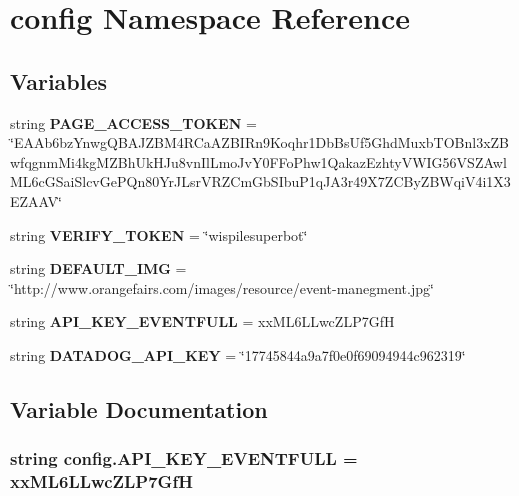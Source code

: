 \section{config Namespace Reference}
\label{namespaceconfig}
\subsection*{Variables}
\begin{DoxyCompactItemize}
\item 
string {\bf P\+A\+G\+E\+\_\+\+A\+C\+C\+E\+S\+S\+\_\+\+T\+O\+K\+EN} = \char`\"{}E\+A\+Ab6bz\+Ynwg\+Q\+B\+A\+J\+Z\+B\+M4\+R\+Ca\+A\+Z\+B\+I\+Rn9\+Koqhr1\+Db\+Bs\+Uf5\+Ghd\+Muxb\+T\+O\+Bnl3x\+Z\+Bwfqgnm\+Mi4kg\+M\+Z\+Bh\+Uk\+H\+Ju8vn\+Il\+Lmo\+Jv\+Y0\+F\+Fo\+Phw1\+Qakaz\+Ezhty\+V\+W\+I\+G56\+V\+S\+Z\+Awl\+M\+L6c\+G\+Sai\+Slcv\+Ge\+P\+Qn80\+Yr\+J\+Lsr\+V\+R\+Z\+Cm\+Gb\+S\+Ibu\+P1q\+J\+A3r49\+X7\+Z\+C\+By\+Z\+B\+Wqi\+V4i1\+X3\+E\+Z\+A\+AV\char`\"{}
\item 
string {\bf V\+E\+R\+I\+F\+Y\+\_\+\+T\+O\+K\+EN} = \char`\"{}wispilesuperbot\char`\"{}
\item 
string {\bf D\+E\+F\+A\+U\+L\+T\+\_\+\+I\+MG} = \char`\"{}http\+://www.\+orangefairs.\+com/images/resource/event-\/manegment.\+jpg\char`\"{}
\item 
string {\bf A\+P\+I\+\_\+\+K\+E\+Y\+\_\+\+E\+V\+E\+N\+T\+F\+U\+LL} = \textquotesingle{}xx\+M\+L6\+L\+Lwc\+Z\+L\+P7\+GfH\textquotesingle{}
\item 
string {\bf D\+A\+T\+A\+D\+O\+G\+\_\+\+A\+P\+I\+\_\+\+K\+EY} = \char`\"{}17745844a9a7f0e0f69094944c962319\char`\"{}
\end{DoxyCompactItemize}


\subsection{Variable Documentation}
\subsubsection[{A\+P\+I\+\_\+\+K\+E\+Y\+\_\+\+E\+V\+E\+N\+T\+F\+U\+LL}]{\setlength{\rightskip}{0pt plus 5cm}string config.\+A\+P\+I\+\_\+\+K\+E\+Y\+\_\+\+E\+V\+E\+N\+T\+F\+U\+LL = \textquotesingle{}xx\+M\+L6\+L\+Lwc\+Z\+L\+P7\+GfH\textquotesingle{}}\label{namespaceconfig_a52c7fc0a714f104fce63a53d3c33fb1e}
